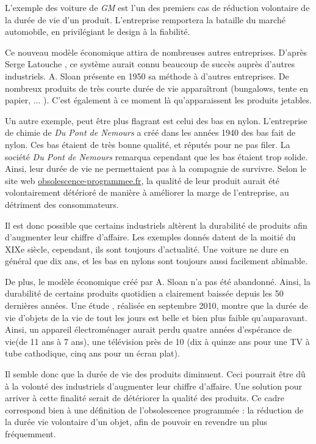 \smallbreak

L'exemple des voiture de \textit{GM} est l'un des premiers cas de réduction volontaire de la durée de vie d'un produit. L'entreprise remportera la bataille du marché automobile, en privilégiant le design à la fiabilité.

Ce nouveau modèle économique attira de nombreuses autres entreprises. D'après Serge Latouche \cite{bpc}, ce système aurait connu beaucoup de succès auprès d'autres industriels. A. Sloan présente en 1950 sa méthode à d'autres entreprises. De nombreux produits de très courte durée de vie apparaîtront (bungalows, tente en papier, ... ). C'est également à ce moment là qu'apparaissent les produits jetables.
 
 
 \smallbreak
Un autre exemple, peut être plus flagrant est celui des bas en nylon.
L'entreprise de chimie de \textit{Du Pont de Nemours} a créé dans les années 1940 des bas fait de nylon.
Ces bas étaient de très bonne qualité, et réputés pour ne pas filer. La société \textit{Du Pont de Nemours} remarqua cependant que les bas étaient trop solide. 
Ainsi, leur durée de vie ne permettaient pas à la compagnie de survivre.
Selon le site web \url{obsolescence-programmee.fr},  la qualité de leur produit aurait été volontairement détérioré de manière à améliorer la marge de l'entreprise, au détriment des consommateurs. 

\medbreak

Il est donc possible que certains industriels altèrent la durabilité de produits afin d'augmenter leur chiffre d'affaire. Les exemples donnés datent de la moitié du XIXe siècle, cependant, ils sont toujours d'actualité. Une voiture ne dure en général que dix ans, et les bas en nylons sont toujours aussi facilement abîmable. 

De plus, le modèle économique créé par A. Sloan n'a pas été abandonné. Ainsi, la durabilité de certains produits quotidien a clairement baissée depuis les 50 dernières années. 
Une étude \cite{opSsg}, réalisée en septembre 2010, montre que la durée de vie d'objets de la vie de tout les jours est belle et bien plus faible qu'auparavant.
Ainsi, un appareil électroménager aurait perdu quatre années d'espérance de vie(de 11 ans à 7 ans), une télévision près de 10 (dix à quinze ans pour une TV à tube cathodique, cinq ans pour un écran plat). 

\medbreak

Il semble donc que la durée de vie des produits diminuent. Ceci pourrait être dû à la volonté des industriels d'augmenter leur chiffre d'affaire. Une solution pour arriver à cette finalité serait de détériorer la qualité des produits. Ce cadre correspond  bien à une définition de l'obsolescence programmée : la réduction de la durée vie volontaire d'un objet, afin de pouvoir en revendre un plus fréquemment. 